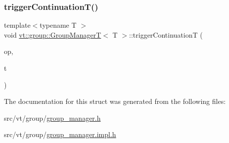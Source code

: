 \subsubsection{\texorpdfstring{trigger\+Continuation\+T()}{triggerContinuationT()}}
{\footnotesize\ttfamily template$<$typename T $>$ \\
void \hyperlink{structvt_1_1group_1_1_group_manager_t}{vt\+::group\+::\+Group\+ManagerT}$<$ T $>$\+::trigger\+ContinuationT (\begin{DoxyParamCaption}\item[{\hyperlink{namespacevt_1_1group_a73f2624ddeb535b39a08b6524f26b244}{Remote\+Operation\+I\+D\+Type} const \&}]{op,  }\item[{T}]{t }\end{DoxyParamCaption})\hspace{0.3cm}{\ttfamily [static]}}



The documentation for this struct was generated from the following files\+:\begin{DoxyCompactItemize}
\item 
src/vt/group/\hyperlink{group__manager_8h}{group\+\_\+manager.\+h}\item 
src/vt/group/\hyperlink{group__manager_8impl_8h}{group\+\_\+manager.\+impl.\+h}\end{DoxyCompactItemize}

